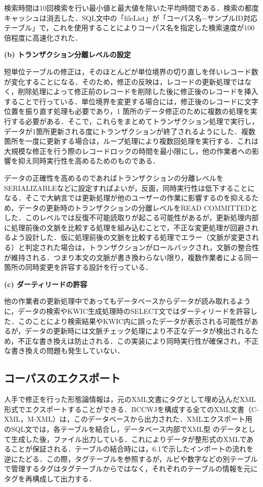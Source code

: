 \documentclass[japanese]{jnlp_1.4}
\begin{document}
検索時間は10回検索を行い最小値と最大値を除いた平均時間である．検索の都度キャッシュは消去した．SQL文中の「fileList」が「コーパス名−サンプルID対応テーブル」で，これを使用することによりコーパス名を指定した検索速度が100倍程度に高速化された．

\noindent
{\bf (b) トランザクション分離レベルの設定}

短単位テーブルの修正は，そのほとんどが単位境界の切り直しを伴いレコード数が変化することになる．そのため，修正の反映は，レコードの更新処理ではなく，削除処理によって修正前のレコードを削除した後に修正後のレコードを挿入することで行っている．単位境界を変更する場合には，修正後のレコードに文字位置を振り直す処理も必要であり，1 箇所のデータ修正のために複数の処理を実行する必要がある．そこで，これらをまとめてトランザクション処理で実行し，データが1箇所更新される度にトランザクションが終了されるようにした．複数箇所を一度に更新する場合は，ループ処理により複数回処理を実行する．これは大規模な修正を行う際のレコードロックの時間を最小限にし，他の作業者への影響を抑え同時実行性を高めるためのものである．

データの正確性を高めるのであればトランザクションの分離レベルをSERIALIZABLEなどに設定すればよいが，反面，同時実行性は低下することになる．そこで大納言では更新処理が他のユーザーの作業に影響するのを抑えるため，データの更新時のトランザクションの分離レベルをREAD COMMITTEDとした．このレベルでは反復不可能読取りが起こる可能性があるが，更新処理内部に処理前後の文脈を比較する処理を組み込むことで，不正な変更処理が回避されるよう設計した．仮に処理前後の文脈を比較する処理でエラー（文脈が変更される）と判定された場合は，トランザクションがロールバックされ，文脈の整合性が維持される．つまり本文の文脈が書き換わらない限り，複数作業者による同一箇所の同時変更を許容する設計を行っている．

\noindent
{\bf (c) ダーティリードの許容}

他の作業者の更新処理中であってもデータベースからデータが読み取れるように，データの検索やKWIC生成処理時のSELECT文ではダーティリードを許容した．このことにより検索結果やKWIC内に誤ったデータが表示される可能性があるが，データの更新時には文脈チェック処理により不正なデータが検出されるため，不正な書き換えは防止される．この実装により同時実行性が確保され，不正な書き換えの問題も発生していない．


\subsection{コーパスのエクスポート}

人手で修正を行った形態論情報は，元のXML文書にタグとして埋め込んだXML形式でエクスポートすることができる．BCCWJを構成する全てのXML文書（C-XML，M-XML）は，このデータベースから出力された．XMLエクスポート用のSQL文では，各テーブルを結合し，データベース内部でXML型 のデータとして生成した後，ファイル出力している．これによりデータが整形式のXMLであることが保証される．テーブルの結合時には，6.1で示したインポートの流れを逆にたどる．この際，タグテーブルを参照するが，ルビや数字などの別テーブルで管理するタグはタグテーブルからではなく，それぞれのテーブルの情報を元にタグを再構成して出力する．
\end{document}

